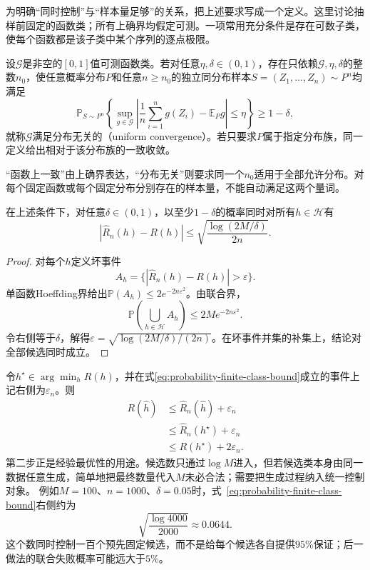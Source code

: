 为明确“同时控制”与“样本量足够”的关系，把上述要求写成一个定义。这里讨论抽样前固定的函数类；所有上确界均假定可测。一项常用充分条件是存在可数子类，使每个函数都是该子类中某个序列的逐点极限。
\begin{definition}[分布无关的一致收敛]
  \label{def:uniform-convergence}
  设\(\mathcal G\)是非空的\([0,1]\)值可测函数类。若对任意\(\eta,\delta\in(0,1)\)，存在只依赖\(\mathcal G,\eta,\delta\)的整数\(n_0\)，使任意概率分布\(P\)和任意\(n\geq n_0\)的独立同分布样本\(S=(Z_1,\ldots,Z_n)\sim P^n\)均满足
  \begin{equation}
    \mathbb P_{S\sim P^n}\left\{
      \sup_{g\in\mathcal G}\left|\frac1n\sum_{i=1}^ng(Z_i)-\mathbb E_Pg\right|\leq\eta
    \right\}\geq1-\delta,
    \label{eq:uniform-convergence-definition}
  \end{equation}
  就称\(\mathcal G\)满足分布无关的（uniform convergence）。若只要求\(P\)属于指定分布族，同一定义给出相对于该分布族的一致收敛。
\end{definition}
“函数上一致”由上确界表达，“分布无关”则要求同一个\(n_0\)适用于全部允许分布。对每个固定函数或每个固定分布分别存在的样本量，不能自动满足这两个量词。

\begin{theorem}[有限函数类的一致误差界]
\label{thm:probability-finite-class-uniform-bound}
在上述条件下，对任意\(\delta\in(0,1)\)，以至少\(1-\delta\)的概率同时对所有\(h\in\mathcal{H}\)有
\begin{equation}
  |\widehat{R}_n(h)-R(h)|
  \leq
  \sqrt{\frac{\log(2M/\delta)}{2n}}.
  \label{eq:probability-finite-class-bound}
\end{equation}
\end{theorem}

\begin{proof}
对每个\(h\)定义坏事件
\[ A_h=
  \{|\widehat{R}_n(h)-R(h)|>\varepsilon\}. \]
单函数Hoeffding界给出\(\mathbb{P}(A_h)\leq2e^{-2n\varepsilon^2}\)。由联合界，
\[ \mathbb{P}\left(\bigcup_{h\in\mathcal{H}}A_h\right)
  \leq 2M e^{-2n\varepsilon^2}. \]
令右侧等于\(\delta\)，解得\(\varepsilon=\sqrt{\log(2M/\delta)/(2n)}\)。在坏事件并集的补集上，结论对
全部候选同时成立。
\end{proof}

令\(h^\star\in\arg\min_hR(h)\)，并在式\eqref{eq:probability-finite-class-bound}成立的事件上记右侧为\(\varepsilon_n\)。则
\[
\begin{aligned}
  R(\widehat{h})
  &\leq
  \widehat{R}_n(\widehat{h})+\varepsilon_n\\
  &\leq
  \widehat{R}_n(h^\star)+\varepsilon_n\\
  &\leq
  R(h^\star)+2\varepsilon_n.
\end{aligned}
\]
第二步正是经验最优性的用途。候选数只通过\(\log M\)进入，但若候选类本身由同一数据任意生成，简单地把最终数量代入\(M\)未必合法；需要把生成过程纳入统一控制对象。
例如\(M=100\)、\(n=1000\)、\(\delta=0.05\)时，式~\eqref{eq:probability-finite-class-bound}右侧约为
\[
  \sqrt{\frac{\log 4000}{2000}}\approx0.0644.
\]
这个数同时控制一百个预先固定候选，而不是给每个候选各自提供\(95\%\)保证；后一做法的联合失败概率可能远大于\(5\%\)。

